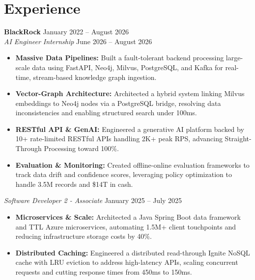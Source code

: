 \documentclass[11pt,a4paper]{article}
\begin{document}
\section{Experience}
\noindent
\textbf{BlackRock} \hfill January 2022 -- August 2026 \\
\textit{AI Engineer Internship} \hfill June 2026 -- August 2026
\begin{itemize}[leftmargin=*,noitemsep,topsep=0pt]
    \item \textbf{Massive Data Pipelines:} Built a fault-tolerant backend processing large-scale data using FastAPI, Neo4j, Milvus, PostgreSQL, and Kafka for real-time, stream-based knowledge graph ingestion.
    \item \textbf{Vector-Graph Architecture:} Architected a hybrid system linking Milvus embeddings to Neo4j nodes via a PostgreSQL bridge, resolving data inconsistencies and enabling structured search under 100ms.
    \item \textbf{RESTful API \& GenAI:} Engineered a generative AI platform backed by 10+ rate-limited RESTful APIs handling 2K+ peak RPS, advancing Straight-Through Processing toward 100\%.
    \item \textbf{Evaluation \& Monitoring:} Created offline-online evaluation frameworks to track data drift and confidence scores, leveraging policy optimization to handle 3.5M records and \$14T in cash.
\end{itemize}

\vspace{3pt}
\noindent
\textit{Software Developer 2 - Associate} \hfill January 2025 -- July 2025
\begin{itemize}[leftmargin=*,noitemsep,topsep=0pt]
    \item \textbf{Microservices \& Scale:} Architected a Java Spring Boot data framework and TTL Azure microservices, automating 1.5M+ client touchpoints and reducing infrastructure storage costs by 40\%.
    \item \textbf{Distributed Caching:} Engineered a distributed read-through Ignite NoSQL cache with LRU eviction to address high-latency APIs, scaling concurrent requests and cutting response times from 450ms to 150ms.
\end{itemize}
\end{document}
